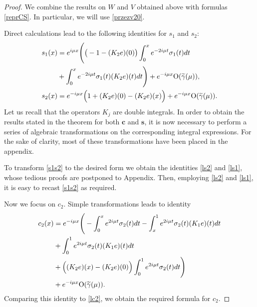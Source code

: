 \documentclass[11pt]{amsart}
\theoremstyle{plain}
\theoremstyle{definition}
\theoremstyle{remark}
\numberwithin{equation}{section}
\begin{document}
\begin{proof}
We combine the results on $W$ and $V$ obtained above with formulas \eqref{reprCS}.
In particular, we will use \eqref{przezv20}.

Direct calculations lead to the following identities for $s_1$ and $s_2$:
\begin{align}\label{s1s2}
s_1(x)&= e^{i\mu x}\Bigg(\big(-1-(K_2e)(0)\big)\int_0^xe^{-2i \mu t}\sigma_1(t) dt
\\
&+\int_0^xe^{-2i \mu t}\sigma_1(t)(K_2e)(t) dt\Bigg)+e^{-i\mu x}{\rm O}(\widetilde{\gamma}(\mu)),\notag \\
s_2(x)&= e^{-i\mu x}\Big(1+(K_2e)(0)-(K_2e)(x)\Big)+e^{-i\mu x}{\rm O}(\widetilde{\gamma}(\mu)).\notag
\end{align}
Let us recall that the operators $K_j$ are double integrals. In order to obtain the results stated in the theorem for both
$\mathbf{c}$ and $\mathbf{s}$, it is now necessary to perform a series of algebraic transformations on the corresponding integral expressions. For the sake of clarity, most of these transformations have been placed in the appendix.

To transform \eqref{s1s2} to the desired form we obtain the identities \eqref{ls2} and \eqref{ls1}, whose
tedious proofs are  postponed to Appendix.
Then, employing \eqref{ls2} and \eqref{ls1}, it is  easy to recast \eqref{s1s2} as required.

Now we focus on $c_2$. Simple transformations leads to identity
\begin{align*}
c_2(x)&= e^{-i\mu x}\Bigg(-\int_0^xe^{2i \mu t}\sigma_2(t) dt-\int_x^1e^{2i \mu t}\sigma_2(t)(K_1e)(t)dt\\
&+\int_0^1e^{2i \mu t}\sigma_2(t)(K_1e)(t) dt\\
&+\Big((K_2e)(x)-(K_2e)(0)\Big)\int_0^1e^{2i \mu t}\sigma_2(t) dt\Bigg)\\
&+e^{-i\mu x }{\rm O}(\widetilde{\gamma}(\mu)).
\end{align*}
Comparing this identity to \eqref{lc2}, we obtain  the required formula for $c_2.$


\end{proof}
\end{document}
